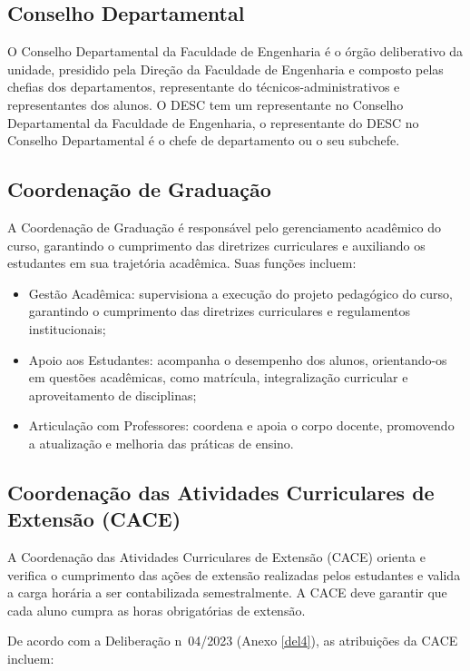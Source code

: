 \subsection{Conselho Departamental}

O Conselho Departamental da Faculdade de Engenharia é o órgão deliberativo da unidade, presidido pela Direção da Faculdade de Engenharia e composto pelas chefias dos departamentos, representante do técnicos-administrativos e representantes dos alunos. O DESC tem um representante no Conselho Departamental da Faculdade de Engenharia, o representante do DESC no Conselho Departamental é o chefe de departamento ou o seu subchefe.


\subsection{Coordenação de Graduação}

A Coordenação de Graduação é responsável pelo gerenciamento acadêmico do curso, garantindo o cumprimento das diretrizes curriculares e auxiliando os estudantes em sua trajetória acadêmica. Suas funções incluem:

\begin{itemize}
    \item Gestão Acadêmica: supervisiona a execução do projeto pedagógico do curso, garantindo o cumprimento das diretrizes curriculares e regulamentos institucionais;
    \item Apoio aos Estudantes: acompanha o desempenho dos alunos, orientando-os em questões acadêmicas, como matrícula, integralização curricular e aproveitamento de disciplinas;
    \item Articulação com Professores: coordena e apoia o corpo docente, promovendo a atualização e melhoria das práticas de ensino.

\end{itemize}

\subsection{Coordenação das Atividades Curriculares de Extensão (CACE)}

A Coordenação das Atividades Curriculares de Extensão (CACE) orienta e verifica o cumprimento das ações de extensão realizadas pelos estudantes e valida a carga horária a ser contabilizada semestralmente. A CACE deve garantir que cada aluno cumpra as horas obrigatórias de extensão.

De acordo com a Deliberação n\textordmasculine~04/2023 (Anexo \ref{del4}), as atribuições da CACE incluem:

